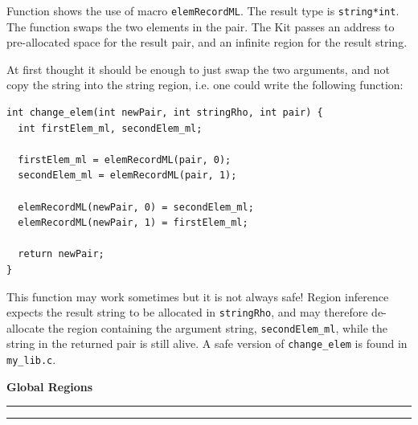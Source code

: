 \documentclass[12pt]{book}
\begin{document}
\begin{example}\label{change_elem.ex}
  Function  shows the use of
  macro \texttt{elemRecordML}. The result type is \texttt{string*int}. The
  function swaps the two elements in the pair. The Kit passes an address to
  pre-allocated space for the result pair, and an infinite region for the
  result string.
  
  At first thought it should be enough to just swap the two arguments, and
  not copy the string into the string region, i.e. one could write the
  following function:

\begin{verbatim}
int change_elem(int newPair, int stringRho, int pair) {
  int firstElem_ml, secondElem_ml;

  firstElem_ml = elemRecordML(pair, 0);
  secondElem_ml = elemRecordML(pair, 1);

  elemRecordML(newPair, 0) = secondElem_ml;
  elemRecordML(newPair, 1) = firstElem_ml;

  return newPair;
}
\end{verbatim}

This function may work sometimes but it is not always safe! Region
inference expects the result string to be allocated in
\texttt{stringRho}, and may therefore de-allocate the region containing
the argument string, \texttt{secondElem\_ml}, while the string in the
returned pair is still alive. A safe version of \texttt{change\_elem} is
found in \texttt{my\_lib.c}.
\end{example}

\printindex
\begin{center}
\bf Global Regions
\end{center}
\smallskip

\hrule
{}
\hrule
\bigskip
\end{document}
